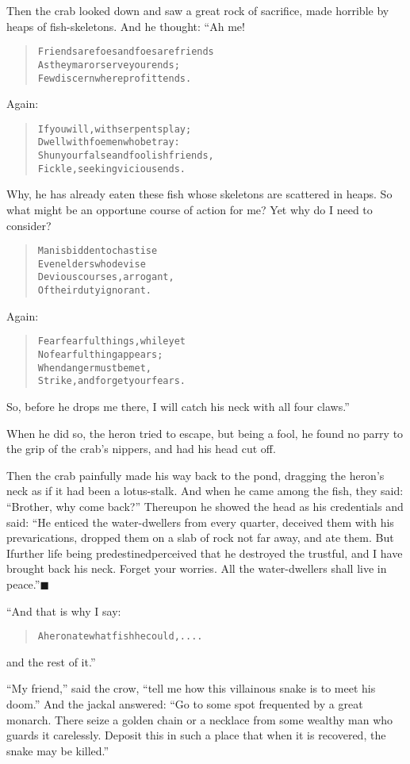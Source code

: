 \documentclass[article, twoside, 14pt]{memoir}
\newcommand{\qed}{\hfill \ensuremath{\blacksquare}}
\renewenvironment{verbatim}{%
\begin{quote}%
\vskip -10pt%
\begin{alltt}\normalfont\large}{\end{alltt}%
\end{quote}%
\vskip -10pt
} %
\begin{document}
Then the crab looked down and saw a great rock of sacrifice, made
horrible by heaps of fish-skeletons. And he thought: “Ah me!

\begin{verbatim}
Friends are foes and foes are friends
As they mar or serve your ends;
Few discern where profit tends.
\end{verbatim}
Again:

\begin{verbatim}
If you will, with serpents play;
Dwell with foemen who betray:
Shun your false and foolish friends,
Fickle, seeking vicious ends.
\end{verbatim}
Why, he has already eaten these fish whose skeletons are scattered
in heaps. So what might be an opportune course of action for me?
Yet why do I need to consider?

\begin{verbatim}
Man is bidden to chastise
Even elders who devise
Devious courses, arrogant,
Of their duty ignorant.
\end{verbatim}
Again:

\begin{verbatim}
Fear fearful things, while yet
    No fearful thing appears;
When danger must be met,
    Strike, and forget your fears.
\end{verbatim}
So, before he drops me there, I will catch his neck with all four
claws.”

When he did so, the heron tried to escape, but being a fool, he
found no parry to the grip of the crab's nippers, and had his head
cut off.

Then the crab painfully made his way back to the pond, dragging the
heron's neck as if it had been a lotus-stalk. And when he came
among the fish, they said: ``Brother, why come back?'' Thereupon he
showed the head as his credentials and said:
``He enticed the water-dwellers from every quarter, deceived them with his prevarications, dropped them on a slab of rock not far away, and ate them. But I{\textemdash}further life being predestined{\textemdash}perceived that he destroyed the trustful, and I have brought back his neck. Forget your worries. All the water-dwellers shall live in peace.''\hyperref[s9]{\qed}

“And that is why I say:

\begin{verbatim}
A heron ate what fish he could, ....
\end{verbatim}
and the rest of it.”

``My friend,'' said the crow,
``tell me how this villainous snake is to meet his doom.'' And the
jackal answered:
``Go to some spot frequented by a great monarch. There seize a golden chain or a necklace from some wealthy man who guards it carelessly. Deposit this in such a place that when it is recovered, the snake may be killed.''
\end{document}
